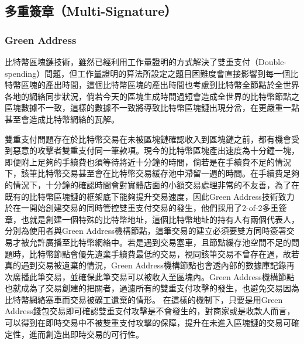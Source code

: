 			\subsection{多重簽章（Multi-Signature）}
			 	\subsubsection{Green Address}
			 	比特幣區塊鏈技術，雖然已經利用工作量證明的方式解決了雙重支付（Double-spending）問題\supercite{Informationpropagationinthebitcoinnetwork}\supercite{Double-spendingfastpaymentsinbitcoin}，但工作量證明的算法所設定之題目困難度會直接影響到每一個比特幣區塊的產出時間，這個比特幣區塊的產出時間也考慮到比特幣全節點於全世界各地的網絡同步狀況，倘若今天的區塊生成時間過短會造成全世界的比特幣節點之區塊數據不一致，這樣的數據不一致將導致比特幣區塊鏈出現分岔，在更嚴重一點甚至會造成比特幣網絡的瓦解。

			 	雙重支付問題存在於比特幣交易在未被區塊鏈確認收入到區塊鏈之前，都有機會受到惡意的攻擊者雙重支付同一筆款項。現今的比特幣區塊產出速度為十分鐘一塊，即便附上足夠的手續費也須等待將近十分鐘的時間，倘若是在手續費不足的情況下，該筆比特幣交易甚至會在比特幣交易緩存池中滯留一週的時間。在手續費足夠的情況下，十分鐘的確認時間會對實體店面的小額交易處理非常的不友善，為了在既有的比特幣區塊鏈的框架底下能夠提升交易速度，因此Green Address技術致力於在一開始創建交易的同時管控雙重支付交易的發生，他們採用了2-of-2多重簽章，也就是創建一個特殊的比特幣地址，這個比特幣地址的持有人有兩個代表人，分別為使用者與Green Address機構節點，這筆交易的建立必須要雙方同時簽署交易才被允許廣播至比特幣網絡中。若是遇到交易塞車，且節點緩存池空間不足的問題時，比特幣節點會優先遺棄手續費最低的交易，視同該筆交易不曾存在過，故若真的遇到交易被遺棄的情況，Green Address機構節點也會透內部的數據庫記錄再次廣播此筆交易，並確保此筆交易可以被收入至區塊內。Green Address機構節點也就成為了交易創建的把關者，過濾所有的雙重支付攻擊的發生，也避免交易因為比特幣網絡塞車而交易被礦工遺棄的情形。
			 	在這樣的機制下，只要是用Green Address錢包交易即可確認雙重支付攻擊是不會發生的，對商家或是收款人而言，可以得到在即時交易中不被雙重支付攻擊的保障，提升在未進入區塊鏈的交易可確定性，進而創造出即時交易的可行性。

